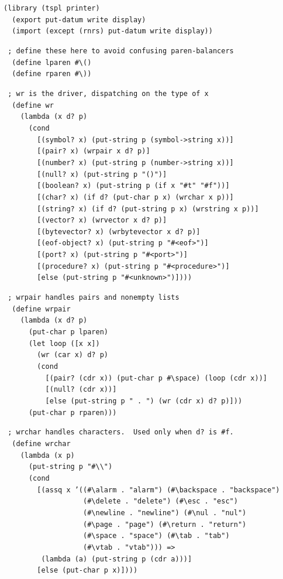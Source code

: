 \begin{alltt}
(library (tspl printer)
  (export put-datum write display)
  (import (except (rnrs) put-datum write display))

 ; define these here to avoid confusing paren-balancers
  (define lparen \#{}\textbackslash{}()
  (define rparen \#{}\textbackslash{}))

 ; wr is the driver, dispatching on the type of x
  (define wr
    (lambda (x d? p)
      (cond
        [(symbol? x) (put-string p (symbol-\textgreater{}string x))]
        [(pair? x) (wrpair x d? p)]
        [(number? x) (put-string p (number-\textgreater{}string x))]
        [(null? x) (put-string p "()")]
        [(boolean? x) (put-string p (if x "\#{}t" "\#{}f"))]
        [(char? x) (if d? (put-char p x) (wrchar x p))]
        [(string? x) (if d? (put-string p x) (wrstring x p))]
        [(vector? x) (wrvector x d? p)]
        [(bytevector? x) (wrbytevector x d? p)]
        [(eof-object? x) (put-string p "\#{}\textless{}eof\textgreater{}")]
        [(port? x) (put-string p "\#{}\textless{}port\textgreater{}")]
        [(procedure? x) (put-string p "\#{}\textless{}procedure\textgreater{}")]
        [else (put-string p "\#{}\textless{}unknown\textgreater{}")])))

 ; wrpair handles pairs and nonempty lists
  (define wrpair
    (lambda (x d? p)
      (put-char p lparen)
      (let loop ([x x])
        (wr (car x) d? p)
        (cond
          [(pair? (cdr x)) (put-char p \#{}\textbackslash{}space) (loop (cdr x))]
          [(null? (cdr x))]
          [else (put-string p " . ") (wr (cdr x) d? p)]))
      (put-char p rparen)))

 ; wrchar handles characters.  Used only when d? is \#{}f.
  (define wrchar
    (lambda (x p)
      (put-string p "\#{}\textbackslash{}\textbackslash{}")
      (cond
        [(assq x '((\#{}\textbackslash{}alarm . "alarm") (\#{}\textbackslash{}backspace . "backspace")
                   (\#{}\textbackslash{}delete . "delete") (\#{}\textbackslash{}esc . "esc")
                   (\#{}\textbackslash{}newline . "newline") (\#{}\textbackslash{}nul . "nul")
                   (\#{}\textbackslash{}page . "page") (\#{}\textbackslash{}return . "return")
                   (\#{}\textbackslash{}space . "space") (\#{}\textbackslash{}tab . "tab")
                   (\#{}\textbackslash{}vtab . "vtab"))) =\textgreater{}
         (lambda (a) (put-string p (cdr a)))]
        [else (put-char p x)])))


\end{alltt}

